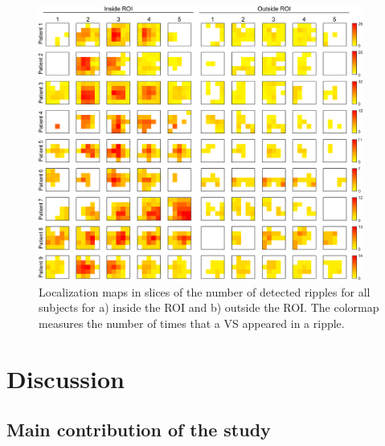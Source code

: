\begin{figure}[h]
\centering
\includegraphics[width=0.95\textwidth]{Images/fig3-8.png}
\caption{Localization maps in slices of the number of detected ripples for all subjects for a) inside the ROI and b) outside the ROI. The colormap measures the number of times that a VS appeared in a ripple. }
\label{fig:3-8}
\end{figure}

\section{Discussion}

\subsection{Main contribution of the study}

